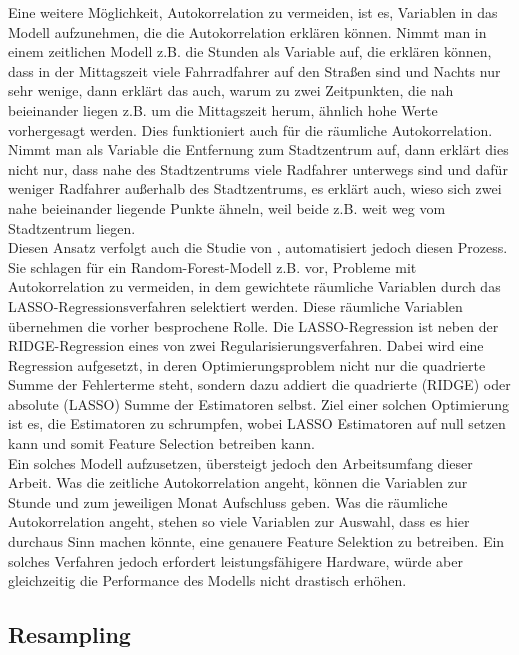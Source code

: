 \documentclass[a4paper,12pt]{thesis}
\begin{document}
Eine weitere Möglichkeit, Autokorrelation zu vermeiden, ist es, Variablen in das Modell aufzunehmen, die die Autokorrelation erklären können. Nimmt man in einem zeitlichen Modell z.B. die Stunden als Variable auf, die erklären können, dass in der Mittagszeit viele Fahrradfahrer auf den Straßen sind und Nachts nur sehr wenige, dann erklärt das auch, warum zu zwei Zeitpunkten, die nah beieinander liegen z.B. um die Mittagszeit herum, ähnlich hohe Werte vorhergesagt werden. Dies funktioniert auch für die räumliche Autokorrelation. Nimmt man als Variable die Entfernung zum Stadtzentrum auf, dann erklärt dies nicht nur, dass nahe des Stadtzentrums viele Radfahrer unterwegs sind und dafür weniger Radfahrer außerhalb des Stadtzentrums, es erklärt auch, wieso sich zwei nahe beieinander liegende Punkte ähneln, weil beide z.B. weit weg vom Stadtzentrum liegen.\\
Diesen Ansatz verfolgt auch die Studie von \cite{LiuAutocorrelation2022}, automatisiert jedoch diesen Prozess. Sie schlagen für ein Random-Forest-Modell z.B. vor, Probleme mit Autokorrelation zu vermeiden, in dem gewichtete räumliche Variablen durch das LASSO-Regressionsverfahren selektiert werden. Diese räumliche Variablen übernehmen die vorher besprochene Rolle. Die LASSO-Regression ist neben der RIDGE-Regression eines von zwei Regularisierungsverfahren. Dabei wird eine Regression aufgesetzt, in deren Optimierungsproblem nicht nur die quadrierte Summe der Fehlerterme steht, sondern dazu addiert die quadrierte (RIDGE) oder absolute (LASSO) Summe der Estimatoren selbst. Ziel einer solchen Optimierung ist es, die Estimatoren zu schrumpfen, wobei LASSO Estimatoren auf null setzen kann und somit Feature Selection betreiben kann.\\
Ein solches Modell aufzusetzen, übersteigt jedoch den Arbeitsumfang dieser Arbeit. Was die zeitliche Autokorrelation angeht, können die Variablen zur Stunde und zum jeweiligen Monat Aufschluss geben. Was die räumliche Autokorrelation angeht, stehen so viele Variablen zur Auswahl, dass es hier durchaus Sinn machen könnte, eine genauere Feature Selektion zu betreiben. Ein solches Verfahren jedoch erfordert leistungsfähigere Hardware, würde aber gleichzeitig die Performance des Modells nicht drastisch erhöhen.

\subsection{Resampling}
\end{document}
